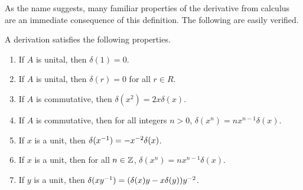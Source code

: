 As the name suggests, many familiar properties of the derivative from calculus
are an immediate consequence of this definition.
The following are easily verified.
\begin{proposition}
  \label{prop_derivation}
  A derivation satisfies the following properties.
  \begin{enumerate}[label=(\roman*)]
    \item If $A$ is unital, then $\delta(1) = 0$.
    \item If $A$ is unital, then $\delta(r) = 0$ for all $r \in R$.
    \item If $A$ is commutative, then $\delta(x^2) = 2x\delta(x)$.
    \item If $A$ is commutative, then for all integers $n > 0$, $\delta(x^n) = nx^{n-1}\delta(x)$.
    \item If $x$ is a unit, then $\delta(x^{-1}) = -x^{-2}\delta(x)$.
    \item If $x$ is a unit, then for all $n \in \mathbb{Z}$, $\delta(x^n) = nx^{n-1}\delta(x)$.
    \item If $y$ is a unit, then $\delta(xy^{-1}) = (\delta(x)y - x\delta(y))y^{-2}$.
  \end{enumerate}
\end{proposition}
